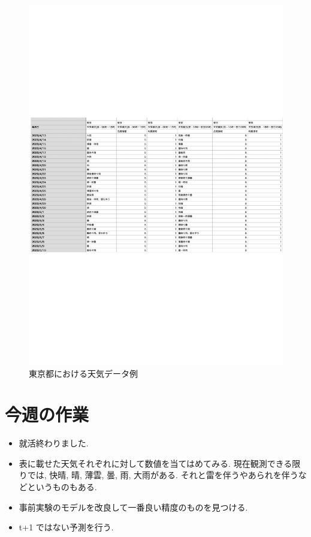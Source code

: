 \begin{figure}[phb]
\centering
\includegraphics[scale=0.8]{exe_wether.pdf}
\caption{東京都における天気データ例}
\end{figure}

%

\section{今週の作業}
\begin{itemize}
        \item 就活終わりました.
        \item 表に載せた天気それぞれに対して数値を当てはめてみる. 現在観測できる限りでは, 快晴, 晴, 薄雲, 曇, 雨, 大雨がある. それと雷を伴うやあられを伴うなどというものもある.
        \item 事前実験のモデルを改良して一番良い精度のものを見つける.
        \item t+1 ではない予測を行う.

\end{itemize}

